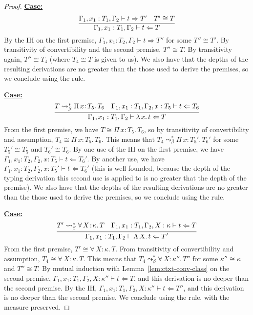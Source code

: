 \documentclass{article}
\newcommand{\abs}[4]{{#1}\, #2\! : \! #3.\, #4}
\newcommand{\absu}[3]{{#1}\, #2.\, #3}
\newcommand{\tpcheck}[0]{\Leftarrow}
\newcommand{\tpsynth}[0]{\Rightarrow}
\newcommand{\startcase}[1]{\vspace{#1} \noindent\textbf{\underline{Case:}}}
\begin{document}
\begin{proof}
  \startcase{.2cm}
  \[
    \infer{
      \Gamma_1,x_1:T_1,\Gamma_2 \vdash t\tpcheck T
    }{
      \Gamma_1,x_1:T_1,\Gamma_2 \vdash t\tpsynth T'
      & T' \cong T
    }
  \]
  By the IH on the first premise, \(\Gamma_1,x_1:T_2,\Gamma_2 \vdash t \tpsynth
  T''\) for some \(T'' \cong T'\).
  By transitivity of convertibility and the second premise, \(T'' \cong T\).
  By transitivity again, \(T'' \cong T_4\) (where \(T_4 \cong T\) is given to
  us).
  We also have that the depths of the resulting derivations are no greater than
  the those used to derive the premises, so we conclude using the rule.
  
  \startcase{.2cm}
  \[
    \infer{
      \Gamma_1,x_1:T_1,\Gamma_2 \vdash \absu{\lambda}{x}{t} \tpcheck T
    }{
      T \leadsto_\beta^* \abs{\Pi}{x}{T_5}{T_6}
      & \Gamma_1,x_1:T_1,\Gamma_2,x:T_5\vdash t\tpcheck T_6
    }
  \]
  From the first premise, we have \(T \cong \abs{\Pi}{x}{T_5}{T_6}\), so by
  transitivity of convertibility and assumption, \(T_4 \cong
  \abs{\Pi}{x}{T_5}{T_6}\).
  This means that \(T_4 \leadsto_\beta^* \abs{\Pi}{x}{T_5'}{T_6'}\) for some
  \(T_5' \cong T_5\) and \(T_6' \cong T_6\).
  By one use of the IH on the first premise, we have
  \(\Gamma_1,x_1:T_2,\Gamma_2,x:T_5 \vdash t \tpcheck T_6'\).
  By another use, we have \(\Gamma_1,x_1:T_2,\Gamma_2,x:T_5' \vdash t \tpcheck
  T_6'\) (this is well-founded, because the depth of the typing derivation this
  second use is  applied to is no greater that the depth of the premise).
  We also have that the depths of the resulting derivations are no greater than
  the those used to derive the premises, so we conclude using the rule.

  \startcase{.2cm}
  \[
    \infer{
      \Gamma_1,x_1:T_1,\Gamma_2 \vdash \absu{\Lambda}{X}{t} \tpcheck T'
    }{
      T' \leadsto_\beta^* \abs{\forall}{X}{\kappa}{T}
      & \Gamma_1,x_1:T_1,\Gamma_2,X:\kappa \vdash t \tpcheck T
    }
  \]
  From the first premise, \(T' \cong \abs{\forall}{X}{\kappa}{T}\).
  From transitivity of convertibility and assumption, \(T_4 \cong
  \abs{\forall}{X}{\kappa}{T}\).
  This means that \(T_4 \leadsto_\beta^* \abs{\forall}{X}{\kappa''}{T''}\) for
  some \(\kappa'' \cong \kappa\) and \(T'' \cong T\).
  By mutual induction with Lemma~\ref{lem:ctxt-conv-class} on the second premise,
  \(\Gamma_1,x_1:T_1,\Gamma_2,X:\kappa'' \vdash t \tpcheck T\), and this
  derivation is no deeper than the second premise.
  By the IH, \(\Gamma_1,x_1:T_1,\Gamma_2,X:\kappa'' \vdash t \tpcheck T''\), and
  this derivation is no deeper than the second premise.
  We conclude using the rule, with the measure preserved.


\end{proof}
\end{document}
